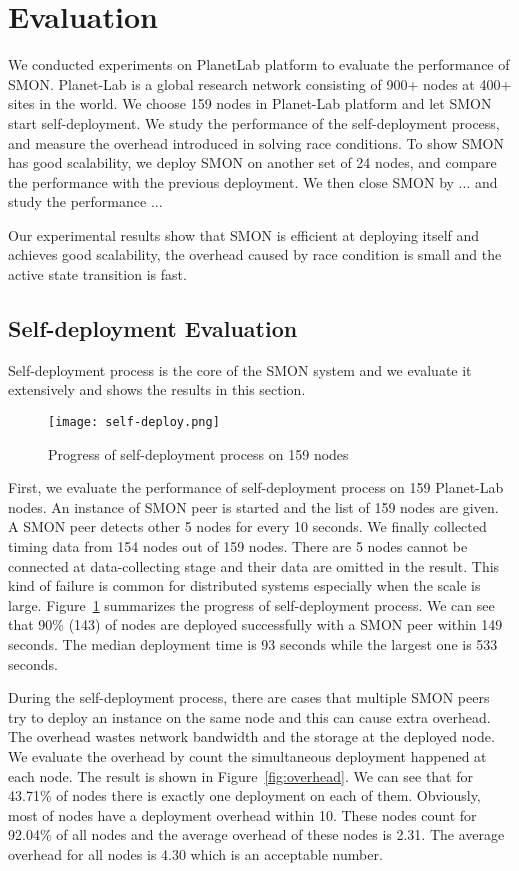 \section{Evaluation}
\label{sec:eval}

We conducted experiments on PlanetLab platform to evaluate
the performance of SMON. Planet-Lab is a global research
network consisting of 900+ nodes at 400+ sites in the world.
We choose 159 nodes in Planet-Lab platform and let SMON
start self-deployment. We study the performance of the
self-deployment process, and measure the overhead introduced
in solving race conditions. To show SMON has good
scalability, we deploy SMON on another set of 24 nodes, and
compare the performance with the previous deployment. We
then close SMON by ... and study the performance ...

Our experimental results show that SMON is efficient at
deploying itself and achieves good scalability, the overhead
caused by race condition is small and the active state
transition is fast.

\subsection{Self-deployment Evaluation}

Self-deployment process is the core of the SMON system and we
evaluate it extensively and shows the results in this section.

\begin{figure}
\centering
\texttt{[image: self-deploy.png]}
\caption{Progress of self-deployment process on 159
nodes}
\label{fig:self-deploy}
\end{figure}


First, we evaluate the performance of self-deployment process on
159 Planet-Lab nodes. An instance of SMON peer is started and the
list of 159 nodes are given. A SMON peer detects other 5 nodes
for every 10 seconds. We finally collected timing data from 154
nodes out of 159 nodes. There are 5 nodes cannot be connected at
data-collecting stage and their data are omitted in the result.
This kind of failure is common for distributed systems
especially when the scale is large. Figure~\ref{fig:self-deploy}
summarizes the progress of self-deployment process.  We can see
that 90\% (143) of nodes are deployed successfully with a SMON
peer within 149 seconds. The median deployment time is 93
seconds while the largest one is 533 seconds. 


During the self-deployment process, there are cases that multiple
SMON peers try to deploy an instance on the same node and this
can cause extra overhead. The overhead wastes network
bandwidth and the storage at the deployed node. We evaluate the
overhead by count the simultaneous deployment happened at each
node. The result is shown in Figure~\ref{fig:overhead}. We can
see that for 43.71\% of nodes there is exactly one deployment
on each of them. Obviously, most of nodes have a deployment
overhead within 10. These nodes count for 92.04\% of all nodes
and the average overhead of these nodes is 2.31. The average
overhead for all nodes is 4.30 which is an acceptable number. 

